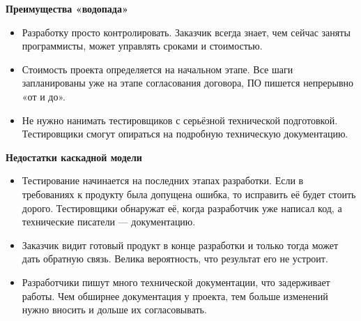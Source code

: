 \documentclass[a4paper]{article}
\begin{document}
\begin{figure}[h]
\end{figure}

\noindent\textbf{Преимущества «водопада»}

\begin{itemize}
    \item Разработку просто контролировать. Заказчик всегда знает, чем сейчас заняты программисты, может управлять сроками и стоимостью.
    \item Стоимость проекта определяется на начальном этапе. Все шаги запланированы уже на этапе согласования договора, ПО пишется непрерывно «от и до».
    \item Не нужно нанимать тестировщиков с серьёзной технической подготовкой. Тестировщики смогут опираться на подробную техническую документацию.
\end{itemize}

\noindent\textbf{Недостатки каскадной модели}

\begin{itemize}
    \item     Тестирование начинается на последних этапах разработки. Если в требованиях к продукту была допущена ошибка, то исправить её будет стоить дорого. Тестировщики обнаружат её, когда разработчик уже написал код, а технические писатели — документацию.
    \item Заказчик видит готовый продукт в конце разработки и только тогда может дать обратную связь. Велика вероятность, что результат его не устроит.
    \item Разработчики пишут много технической документации, что задерживает работы. Чем обширнее документация у проекта, тем больше изменений нужно вносить и дольше их согласовывать.
\end{itemize}
\end{document}
